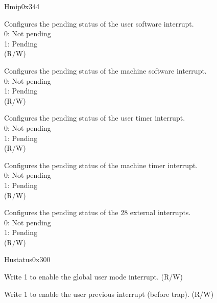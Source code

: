 \begin{register}{H}{mip}{0x344}\label{regdesc:MIP}
%
%
%
%
%
%
%
\regnewline%
\begin{regdesc}\begin{reglist}
\label{fielddesc:MIPUSIP}\item [USIP] Configures the pending status of the user software interrupt.\\
0: Not pending\\
1: Pending\\
(R/W)
\label{fielddesc:MIPMSIP}\item [MSIP] Configures the pending status of the machine software interrupt. \\
0: Not pending\\
1: Pending\\
(R/W)
\label{fielddesc:MIPUTIP}\item [UTIP] Configures the pending status of the user timer interrupt. \\
0: Not pending\\
1: Pending\\
(R/W)
\label{fielddesc:MIPMTIP}\item [MTIP] Configures the pending status of the machine timer interrupt. \\
0: Not pending\\
1: Pending\\
(R/W)
\label{fielddesc:MIPMXIP}\item [MXIP] Configures the pending status of the 28 external interrupts. \\
0: Not pending\\
1: Pending\\
(R/W)
\end{reglist}\end{regdesc}
\end{register}

\begin{register}{H}{ustatus}{0x300}\label{regdesc:USTATUS}
%
%
%
%
\regnewline%
\begin{regdesc}\begin{reglist}
\label{fielddesc:USTATUSUIE}\item [UIE] Write 1 to enable the global user mode interrupt. (R/W)
\label{fielddesc:USTATUSUPIE}\item [UPIE] Write 1 to enable the user previous interrupt (before trap). (R/W)
\end{reglist}\end{regdesc}
\end{register}

